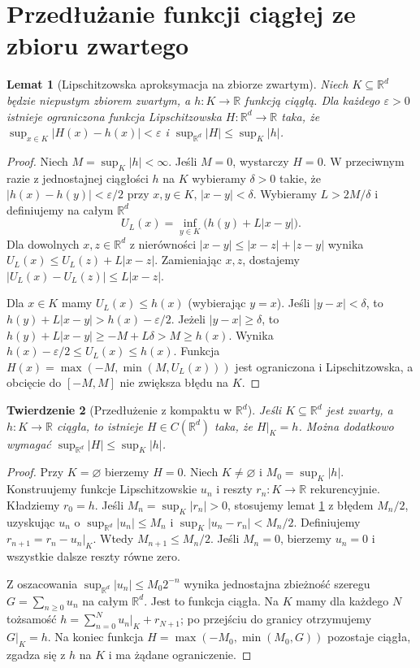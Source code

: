 \documentclass[11pt,a4paper,oneside]{book}
\numberwithin{equation}{chapter}
\theoremstyle{plain}
\newtheorem{twierdzenie}{Twierdzenie}[chapter]
\newtheorem{lemat}[twierdzenie]{Lemat}
\theoremstyle{definition}
\theoremstyle{remark}
\begin{document}
\section{Przedłużanie funkcji ciągłej ze zbioru zwartego}

\begin{lemat}[Lipschitzowska aproksymacja na zbiorze zwartym]
\label{lem:lipschitz-approx-compact-10}
Niech $K\subseteq\mathbb R^d$ będzie niepustym
zbiorem zwartym, a $h:K\to\mathbb R$ funkcją ciągłą.
Dla każdego $\varepsilon>0$ istnieje ograniczona
funkcja Lipschitzowska $H:\mathbb R^d\to\mathbb R$
taka, że
$\sup_{x\in K}|H(x)-h(x)|<\varepsilon$
i $\sup_{\mathbb R^d}|H|\le\sup_K|h|$.
\end{lemat}
\begin{proof}
Niech $M=\sup_K|h|<\infty$. Jeśli $M=0$,
wystarczy $H=0$. W przeciwnym razie z jednostajnej
ciągłości $h$ na $K$ wybieramy $\delta>0$ takie, że
$|h(x)-h(y)|<\varepsilon/2$ przy
$x,y\in K$, $|x-y|<\delta$.
Wybieramy $L>2M/\delta$ i definiujemy na
całym $\mathbb R^d$
\[
U_L(x)=\inf_{y\in K}\bigl(h(y)+L|x-y|\bigr).
\]
Dla dowolnych $x,z\in\mathbb R^d$ z nierówności
$|x-y|\le|x-z|+|z-y|$ wynika
$U_L(x)\le U_L(z)+L|x-z|$. Zamieniając $x,z$,
dostajemy $|U_L(x)-U_L(z)|\le L|x-z|$.

Dla $x\in K$ mamy $U_L(x)\le h(x)$ (wybierając
$y=x$). Jeśli $|y-x|<\delta$, to
$h(y)+L|x-y|>h(x)-\varepsilon/2$.
Jeżeli $|y-x|\ge\delta$, to
$h(y)+L|x-y|\ge-M+L\delta>M\ge h(x)$.
Wynika $h(x)-\varepsilon/2\le U_L(x)\le h(x)$.
Funkcja
$H(x)=\max(-M,\min(M,U_L(x)))$
jest ograniczona i Lipschitzowska, a obcięcie do
$[-M,M]$ nie zwiększa błędu na $K$.
\end{proof}

\begin{twierdzenie}[Przedłużenie z kompaktu w $\mathbb R^d$]
\label{thm:compact-extension-10}
Jeśli $K\subseteq\mathbb R^d$ jest zwarty,
a $h:K\to\mathbb R$ ciągła, to istnieje
$H\in C(\mathbb R^d)$ taka, że $H|_K=h$.
Można dodatkowo wymagać
$\sup_{\mathbb R^d}|H|\le\sup_K|h|$.
\end{twierdzenie}
\begin{proof}
Przy $K=\varnothing$ bierzemy $H=0$.
Niech $K\ne\varnothing$ i $M_0=\sup_K|h|$.
Konstruujemy funkcje Lipschitzowskie $u_n$ i
reszty $r_n:K\to\mathbb R$ rekurencyjnie.
Kładziemy $r_0=h$. Jeśli
$M_n=\sup_K|r_n|>0$, stosujemy lemat
\ref{lem:lipschitz-approx-compact-10} z błędem
$M_n/2$, uzyskując $u_n$ o
$\sup_{\mathbb R^d}|u_n|\le M_n$ i
$\sup_K|u_n-r_n|<M_n/2$.
Definiujemy $r_{n+1}=r_n-u_n|_K$.
Wtedy $M_{n+1}\le M_n/2$. Jeśli $M_n=0$,
bierzemy $u_n=0$ i wszystkie dalsze reszty
równe zero.

Z oszacowania
$\sup_{\mathbb R^d}|u_n|\le M_0 2^{-n}$
wynika jednostajna zbieżność szeregu
$G=\sum_{n\ge0}u_n$ na całym $\mathbb R^d$.
Jest to funkcja ciągła. Na $K$ mamy dla każdego
$N$ tożsamość
$h=\sum_{n=0}^Nu_n|_K+r_{N+1}$;
po przejściu do granicy otrzymujemy $G|_K=h$.
Na koniec funkcja $H=\max(-M_0,\min(M_0,G))$
pozostaje ciągła, zgadza się z $h$ na $K$
i ma żądane ograniczenie.
\end{proof}
\end{document}
